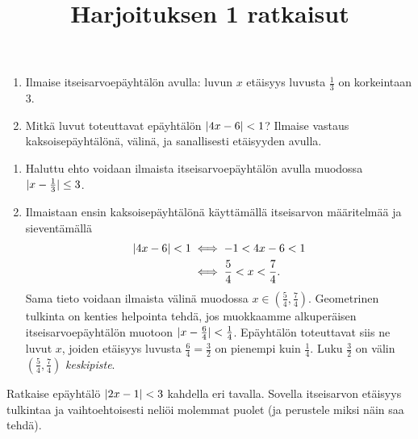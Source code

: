 \documentclass[12pt,a4paper]{article}
\title{Harjoituksen 1 ratkaisut}
\author{}
\date{}
\begin{document}
\maketitle

\noindent

\begin{exercise}
  \leavevmode\par
\begin{enumerate}[label=\alph*), nosep]
  \item Ilmaise itseisarvoepäyhtälön avulla: luvun \(x\) etäisyys luvusta
    \(\frac{1}{3}\) on korkeintaan \(3\).
  \item Mitkä luvut toteuttavat epäyhtälön \(\lvert4x - 6\rvert < 1\)? Ilmaise
    vastaus kaksoisepäyhtälönä, välinä, ja sanallisesti etäisyyden avulla.
\end{enumerate}
\end{exercise}

\begin{solution}
\leavevmode\par
\begin{enumerate}[label=\alph*), nosep]
\item Haluttu ehto voidaan ilmaista itseisarvoepäyhtälön avulla muodossa
  \(\lvert x - \frac{1}{3}\rvert \leq 3\).
\item Ilmaistaan ensin kaksoisepäyhtälönä käyttämällä itseisarvon määritelmää
  ja sieventämällä
  \begin{align*}
    \lvert4x - 6\rvert < 1 &\iff -1 < 4x - 6 < 1 \\
    &\iff \frac{5}{4} < x < \frac{7}{4}.
  \end{align*}
  Sama tieto voidaan ilmaista välinä muodossa \(x \in \left(\frac{5}{4},
  \frac{7}{4}\right)\). Geometrinen tulkinta on kenties helpointa tehdä, jos
  muokkaamme alkuperäisen itseisarvoepäyhtälön muotoon
  \(\lvert x - \frac{6}{4}\rvert < \frac{1}{4}\). Epäyhtälön toteuttavat siis ne luvut
  \(x\), joiden etäisyys luvusta \(\frac{6}{4} = \frac{3}{2}\) on pienempi kuin
  \(\frac{1}{4}\). Luku \(\frac{3}{2}\) on välin
  \(\left(\frac{5}{4}, \frac{7}{4}\right)\) \emph{keskipiste}.
\end{enumerate}
\end{solution}

\begin{exercise}
Ratkaise epäyhtälö \(\lvert2x - 1\rvert < 3\) kahdella eri tavalla. Sovella
itseisarvon etäisyys tulkintaa ja vaihtoehtoisesti neliöi molemmat puolet
(ja perustele miksi näin saa tehdä).
\end{exercise}
\end{document}
